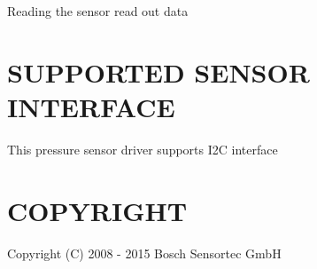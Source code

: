 Reading the sensor read out data

\section*{S\+U\+P\+P\+O\+R\+T\+ED S\+E\+N\+S\+OR I\+N\+T\+E\+R\+F\+A\+CE }


\begin{DoxyItemize}
\item This pressure sensor driver supports I2C interface
\end{DoxyItemize}

\section*{C\+O\+P\+Y\+R\+I\+G\+HT }


\begin{DoxyItemize}
\item Copyright (C) 2008 -\/ 2015 Bosch Sensortec GmbH 
\end{DoxyItemize}